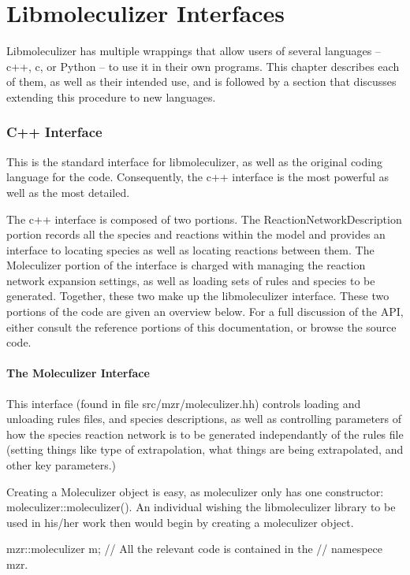 \chapter{Libmoleculizer Interfaces}
Libmoleculizer has multiple wrappings that allow users of several
languages -- c++, c, or Python -- to use it in their own programs.
This chapter describes each of them, as well as their intended use,
and is followed by a section that discusses extending this procedure
to new languages.  

\subsection{C++ Interface}
This is the standard interface for libmoleculizer, as well as the
original coding language for the code.  Consequently, the c++
interface is the most powerful as well as the most detailed.

The c++ interface is composed of two portions. The
ReactionNetworkDescription portion records all the species and
reactions within the model and provides an interface to 
locating species as well as locating reactions between them.  The
Moleculizer portion of the interface is charged with managing the reaction
network expansion settings, as well as loading sets of rules and
species to be generated.  Together, these two make up the
libmoleculizer interface.  These two portions of the code are
given an overview below.  For a full discussion of the API, either
consult the reference portions of this documentation, or browse the
source code. 

\subsubsection{The Moleculizer Interface}
This interface (found in file src/mzr/moleculizer.hh) controls loading
and unloading rules files, and species descriptions, as well as
controlling parameters of how the species reaction network is to be
generated independantly of the rules file (setting things like type of
extrapolation, what things are being extrapolated, and other key
parameters.)

Creating a Moleculizer object is easy, as moleculizer only has one
constructor: moleculizer::moleculizer().  An individual wishing the
libmoleculizer library to be used in his/her work then would begin by
creating a moleculizer object. 

mzr::moleculizer m; // All the relevant code is contained in the
                    // namespece mzr.

